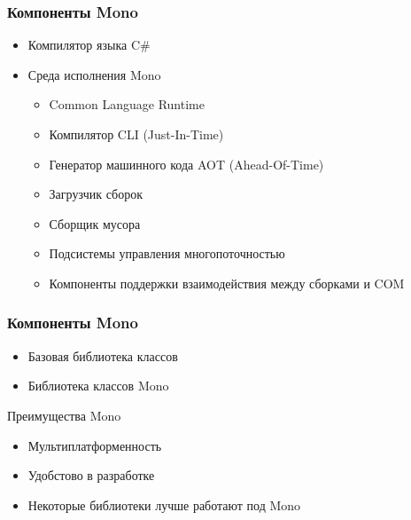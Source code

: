 \documentclass[14pt,pdf,hyperref={unicode}]{beamer}
\begin{document}
\begin{frame}
\frametitle{Компоненты Mono}
\begin{itemize}{}
    \item Компилятор языка C\#
    \item Среда исполнения Mono
    \begin{itemize}{}
        \item Common Language Runtime
        \item Компилятор CLI (Just-In-Time)
        \item Генератор машинного кода AOT (Ahead-Of-Time)
        \item Загрузчик сборок
        \item Сборщик мусора
        \item Подсистемы управления многопоточностью
        \item Компоненты поддержки взаимодействия между сборками и COM
    \end{itemize}
\end{itemize}
\end{frame}

\begin{frame}
\frametitle{Компоненты Mono}
\begin{itemize}
    \item Базовая библиотека классов
    \item Библиотека классов Mono
\end{itemize}
\end{frame}

\begin{frame}{Преимущества Mono}
    \begin{itemize}
        \item Мультиплатформенность
        \item Удобстово в разработке
        \item Некоторые библиотеки лучше работают под Mono
    \end{itemize}
\end{frame}
\end{document}
